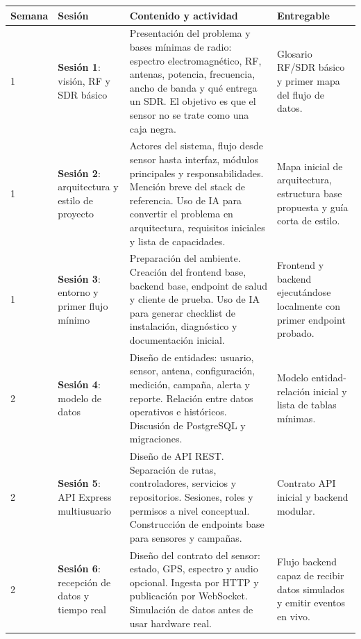 \documentclass[11pt,a4paper]{article}
\newcommand{\sesion}[1]{\textbf{Sesión #1}}
\begin{document}
\begin{longtable}{|p{}|p{}|p{}|p{}|}
\hline
\textbf{Semana} & \textbf{Sesión} & \textbf{Contenido y actividad} & \textbf{Entregable} \\
\hline
\endhead

1 & \sesion{1}: visión, RF y SDR básico &
Presentación del problema y bases mínimas de radio: espectro electromagnético, RF, antenas, potencia, frecuencia, ancho de banda y qué entrega un SDR. El objetivo es que el sensor no se trate como una caja negra. &
Glosario RF/SDR básico y primer mapa del flujo de datos. \\
\hline

1 & \sesion{2}: arquitectura y estilo de proyecto &
Actores del sistema, flujo desde sensor hasta interfaz, módulos principales y responsabilidades. Mención breve del stack de referencia. Uso de IA para convertir el problema en arquitectura, requisitos iniciales y lista de capacidades. &
Mapa inicial de arquitectura, estructura base propuesta y guía corta de estilo. \\
\hline

1 & \sesion{3}: entorno y primer flujo mínimo &
Preparación del ambiente. Creación del frontend base, backend base, endpoint de salud y cliente de prueba. Uso de IA para generar checklist de instalación, diagnóstico y documentación inicial. &
Frontend y backend ejecutándose localmente con primer endpoint probado. \\
\hline

2 & \sesion{4}: modelo de datos &
Diseño de entidades: usuario, sensor, antena, configuración, medición, campaña, alerta y reporte. Relación entre datos operativos e históricos. Discusión de PostgreSQL y migraciones. &
Modelo entidad-relación inicial y lista de tablas mínimas. \\
\hline

2 & \sesion{5}: API Express multiusuario &
Diseño de API REST. Separación de rutas, controladores, servicios y repositorios. Sesiones, roles y permisos a nivel conceptual. Construcción de endpoints base para sensores y campañas. &
Contrato API inicial y backend modular. \\
\hline

2 & \sesion{6}: recepción de datos y tiempo real &
Diseño del contrato del sensor: estado, GPS, espectro y audio opcional. Ingesta por HTTP y publicación por WebSocket. Simulación de datos antes de usar hardware real. &
Flujo backend capaz de recibir datos simulados y emitir eventos en vivo. \\
\hline


\end{longtable}
\end{document}

